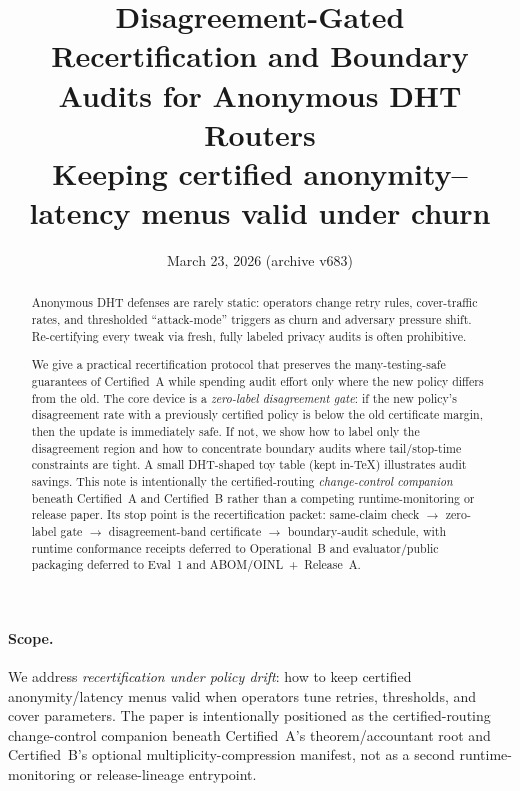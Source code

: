 \documentclass[11pt]{article}
\title{\textbf{Disagreement-Gated Recertification and Boundary Audits for Anonymous DHT Routers}\\
\large Keeping certified anonymity--latency menus valid under churn}
\author{}
\date{March 23, 2026 (archive v683)}
\begin{document}
\maketitle

\begin{abstract}
Anonymous DHT defenses are rarely static: operators change retry rules, cover-traffic rates, and thresholded ``attack-mode'' triggers as churn and adversary pressure shift.
Re-certifying every tweak via fresh, fully labeled privacy audits is often prohibitive.

We give a practical recertification protocol that preserves the many-testing-safe guarantees of Certified~A while spending audit effort only where the new policy differs from the old.
The core device is a \emph{zero-label disagreement gate}: if the new policy's disagreement rate with a previously certified policy is below the old certificate margin, then the update is immediately safe.
If not, we show how to label only the disagreement region and how to concentrate boundary audits where tail/stop-time constraints are tight.
A small DHT-shaped toy table (kept in-\TeX) illustrates audit savings. This note is intentionally the certified-routing \emph{change-control companion} beneath Certified~A and Certified~B rather than a competing runtime-monitoring or release paper. Its stop point is the recertification packet: same-claim check $\rightarrow$ zero-label gate $\rightarrow$ disagreement-band certificate $\rightarrow$ boundary-audit schedule, with runtime conformance receipts deferred to Operational~B and evaluator/public packaging deferred to Eval~1 and ABOM/OINL~+~Release~A.
\end{abstract}


\paragraph{Scope.}
We address \emph{recertification under policy drift}: how to keep certified anonymity/latency menus valid when operators tune retries, thresholds, and cover parameters. The paper is intentionally positioned as the certified-routing change-control companion beneath Certified~A's theorem/accountant root and Certified~B's optional multiplicity-compression manifest, not as a second runtime-monitoring or release-lineage entrypoint.
\end{document}
